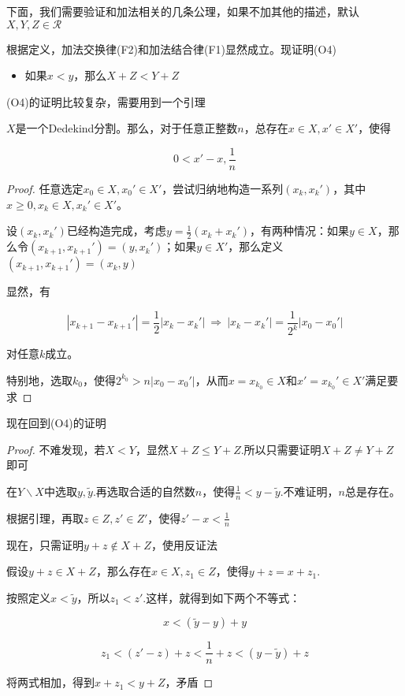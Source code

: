 下面，我们需要验证和加法相关的几条公理，如果不加其他的描述，默认$X,Y,Z\in\mathcal{R}$

根据定义，加法交换律(F2)和加法结合律(F1)显然成立。现证明(O4)

\begin{itemize}
    \item[(O4)] 如果$x<y$，那么$X+Z<Y+Z$ 
\end{itemize}

(O4)的证明比较复杂，需要用到一个引理

\begin{lemma}
    $X$是一个Dedekind分割。那么，对于任意正整数$n$，总存在$x\in X,x'\in X'$，使得

    \begin{equation*}
        0<x'-x,\frac{1}{n}
    \end{equation*}
\end{lemma}

\begin{proof}
    任意选定$x_0\in X,x_0'\in X'$，尝试归纳地构造一系列$(x_k,x_k')$，其中$x\geq 0,x_k \in X,x_k'\in X'$。

    设$(x_k,x_k')$已经构造完成，考虑$y=\displaystyle \frac{1}{2}(x_k+x_k')$，有两种情况：如果$y\in X$，那么令$(x_{k+1},x_{k+1}')=(y,x_k')$；如果$y\in X'$，那么定义$(x_{k+1},x_{k+1}')=(x_k,y)$

    显然，有

    \begin{equation*}
        |x_{k+1}-x_{k+1}'|=\frac{1}{2}|x_k-x_k'|\ \Rightarrow \ |x_k-x_k'| = \frac{1}{2^k}|x_0-x_0'|
    \end{equation*}

    对任意$k$成立。

    特别地，选取$k_0$，使得$2^{k_0}>n|x_0-x_0'|$，从而$x=x_{k_0}\in X$和$x'=x_{k_0}'\in X'$满足要求

    \qde
\end{proof}

现在回到(O4)的证明

\begin{proof}
    不难发现，若$X<Y$，显然$X+Z\leq Y+Z$.所以只需要证明$X+Z\neq Y+Z$即可

    在$Y\backslash X$中选取$y,\tilde{y}$.再选取合适的自然数$n$，使得$\displaystyle \frac{1}{n}<y-\tilde{y}$.不难证明，$n$总是存在。

    根据引理，再取$z\in Z,z'\in Z'$，使得$\displaystyle z'-x<\frac{1}{n}$

    现在，只需证明$y+z\notin X+Z$，使用反证法

    假设$y+z \in X+Z$，那么存在$x\in X,z_1\in Z$，使得$y+z=x+z_1$.

    按照定义$x<\tilde{y}$，所以$z_1<z'$.这样，就得到如下两个不等式：

    \begin{equation*}
        x<(\tilde{y}-y)+y
    \end{equation*}

    \begin{equation*}
        z_1<(z'-z)+z<\frac{1}{n}+z<(y-\tilde{y})+z
    \end{equation*}

    将两式相加，得到$x+z_1<y+Z$，矛盾
\end{proof}

